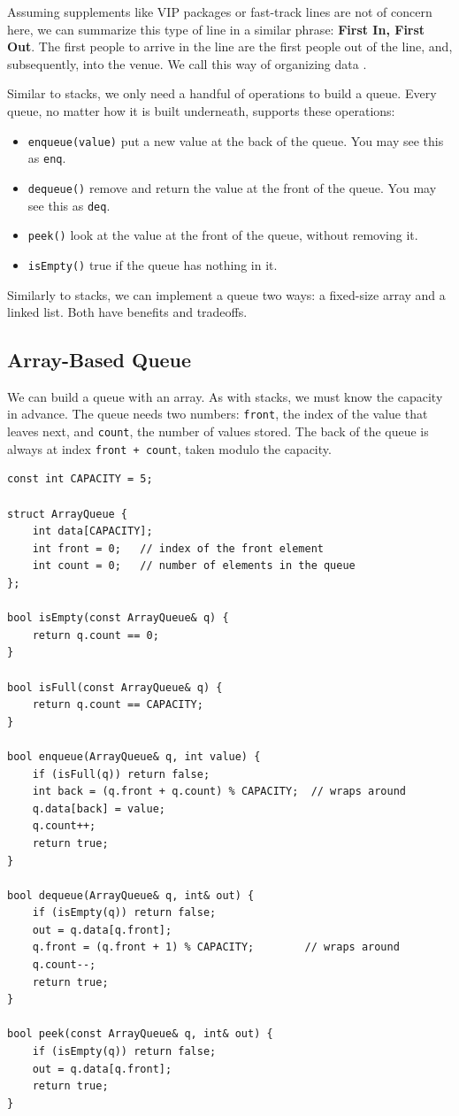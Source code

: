 Assuming supplements like VIP packages or fast-track lines are not of concern here, we can summarize this type of line in a similar phrase: \textbf{First In, First Out}. The first people to arrive in the line are the first people out of the line, and, subsequently, into the venue. We call this way of organizing data .

Similar to stacks, we only need a handful of operations to build a queue. Every queue, no matter how it is built underneath, supports these operations:

\begin{itemize}
    \item {}\texttt{enqueue(value)} put a new value at the back of the queue. You may see this as \texttt{enq}.
    \item {}\texttt{dequeue()} remove and return the value at the front of the queue. You may see this as \texttt{deq}.
    \item {}\texttt{peek()} look at the value at the front of the queue, without removing it.
    \item \texttt{isEmpty()} true if the queue has nothing in it.
\end{itemize}

Similarly to stacks, we can implement a queue two ways: a fixed-size array and a linked list. Both have benefits and tradeoffs.

\subsection{Array-Based Queue}
We can build a queue with an array. As with stacks, we must know the capacity in advance. The queue needs two numbers: \texttt{front}, the index of the value that leaves next, and \texttt{count}, the number of values stored. The back of the queue is always at index \texttt{front + count}, taken modulo the capacity.

\begin{verbatim}
const int CAPACITY = 5;

struct ArrayQueue {
    int data[CAPACITY];
    int front = 0;   // index of the front element
    int count = 0;   // number of elements in the queue
};

bool isEmpty(const ArrayQueue& q) {
    return q.count == 0;
}

bool isFull(const ArrayQueue& q) {
    return q.count == CAPACITY;
}

bool enqueue(ArrayQueue& q, int value) {
    if (isFull(q)) return false;
    int back = (q.front + q.count) % CAPACITY;  // wraps around
    q.data[back] = value;
    q.count++;
    return true;
}

bool dequeue(ArrayQueue& q, int& out) {
    if (isEmpty(q)) return false;
    out = q.data[q.front];
    q.front = (q.front + 1) % CAPACITY;        // wraps around
    q.count--;
    return true;
}

bool peek(const ArrayQueue& q, int& out) {
    if (isEmpty(q)) return false;
    out = q.data[q.front];
    return true;
}
\end{verbatim}

